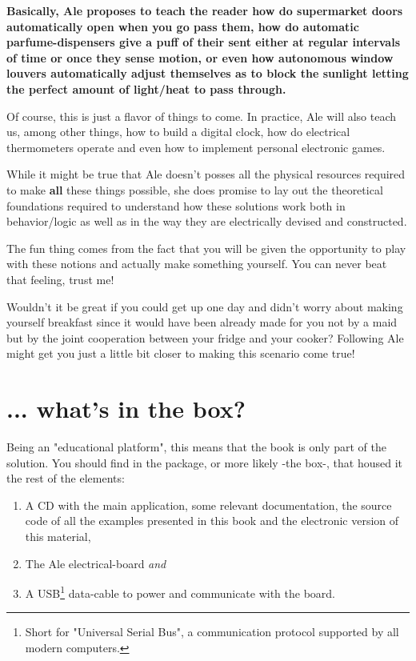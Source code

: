 \documentclass[12pt, a4paper]{book}
\begin{document}
\indent \textbf{Basically, Ale proposes to teach the reader how do supermarket doors automatically open when you go pass them, how do automatic parfume-dispensers give a puff of their sent either at regular intervals of time or once they sense motion, or even how autonomous window louvers automatically adjust themselves as to block the sunlight letting the perfect amount of light/heat to pass through.}

Of course, this is just a flavor of things to come. In practice, Ale will also teach us, among other things, how to build a digital clock, how do electrical thermometers operate and even how to implement personal electronic games.

While it might be true that Ale doesn't posses all the physical resources required to make \textbf{all} these things possible, she does promise to lay out the theoretical foundations required to understand how these solutions work both in behavior/logic as well as in the way they are electrically devised and constructed.

The fun thing comes from the fact that you will be given the opportunity to play with these notions and actually make something yourself. You can never beat that feeling, trust me! 

Wouldn't it be great if you could get up one day and didn't worry about making yourself breakfast since it would have been already made for you not by a maid but by the joint cooperation between your fridge and your cooker? Following Ale might get you just a little bit closer to making this scenario come true!  
 
\section{... what's in the box?}

Being an "educational platform", this means that the book is only part of the solution. You should find in the package, or more likely -the box-, that housed it the rest of the elements:

\begin{enumerate}
  \item A CD with the main application, some relevant documentation, the source code of all the examples presented in this book and the electronic version of this material,
  \item The Ale electrical-board \textit{and}
  \item A USB\footnote{Short for "Universal Serial Bus", a communication protocol supported by all modern computers.} data-cable to power and communicate with the board. 
\end{enumerate}
\end{document}
